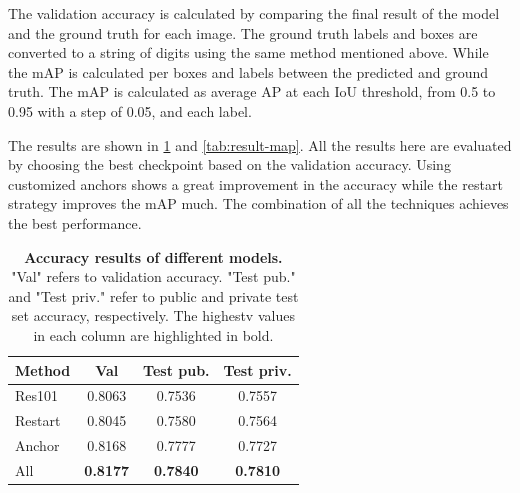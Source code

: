 \documentclass[10pt,twocolumn,letterpaper]{article}
\begin{document}
The validation accuracy is calculated by comparing the final result of the model and
the ground truth for each image. The ground truth labels and boxes are converted to
a string of digits using the same method mentioned above. While the mAP is calculated
per boxes and labels between the predicted and ground truth. The mAP is calculated as
average AP at each IoU threshold, from 0.5 to 0.95 with a step of 0.05, and each label.

The results are shown in \cref{tab:result-acc} and \cref{tab:result-map}. All the results here
are evaluated by choosing the best checkpoint based on the validation accuracy. Using
customized anchors shows a great improvement in the accuracy while the restart strategy
improves the mAP much. The combination of all the techniques achieves the best performance.

\begin{table}[h]
  \centering
  \begin{tabular}{lccc}
    \toprule
    \multicolumn{1}{c}{\textbf{Method}} & \textbf{Val}    & \textbf{Test pub.} & \textbf{Test priv.} \\
    \midrule
    Res101                              & 0.8063          & 0.7536             & 0.7557              \\
    Restart                             & 0.8045          & 0.7580             & 0.7564              \\
    Anchor                              & 0.8168          & 0.7777             & 0.7727              \\
    All                                 & \textbf{0.8177} & \textbf{0.7840}    & \textbf{0.7810}     \\
    \bottomrule
  \end{tabular}
  \caption{\textbf{Accuracy results of different models.} "Val" refers to
    validation accuracy. "Test pub." and "Test priv." refer to public and
    private test set accuracy, respectively. The highestv values in each
    column are highlighted in bold.
  }
  \label{tab:result-acc}
\end{table}
\end{document}
